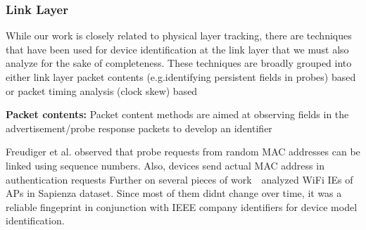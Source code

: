     
    \begin{comment}
    a device compared to other devices.
    Mainly, these attacks assume that an attacker 
    
     However, signal
    propagation techniques are unstable to changes in channel conditions, and
    therefore hasn't been shown to reliably work outside lab settings. In
    comparison, our technique operates independent of varying environments in
    public spaces, making it a stronger attack space.
    
    Techniques have been designed to fingerprint radios of various protocols.
    
    An adversary can succesfully only exploit BLE advertisements for tracking, if
    they can be reliably fingeprinted in any public environment. 
    
    
    Existing research in RF fingerprinting have demonstrated varying degrees of
    success, but in laboratory or controlled indoor environments.
    
    This is primarily due to short packet duration ($\le1ms$) of these
    advertisements, as well as the narrowband nature of Bluetooth transmissions.
    \end{comment}
    
    
    \subsubsection{Link Layer}
    While our work is closely related to physical layer tracking, there are techniques that have been used for device identification at the link layer that we must also analyze for the sake of completeness.
    These techniques are broadly grouped into either link layer packet contents (e.g.identifying persistent fields in probes) based or packet timing analysis (clock skew) based
    
    \noindent\textbf{Packet contents:}
    Packet content methods are aimed at observing fields in the advertisement/probe response packets to develop an identifier
    
    Freudiger et al.\cite{sn1} observed that probe requests from random MAC
    addresses can be linked using sequence numbers. Also, devices send actual MAC
    address in authentication requests
    Further on several pieces of work~\cite{infelem1,infelem3}~analyzed WiFi IEs of APs in Sapienza dataset. Since most of them didnt change over time, it was a reliable fingeprint in conjunction with IEEE company identifiers for device model identification.
    

